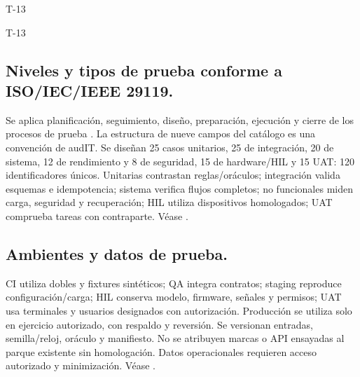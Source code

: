 \ifdefined\FormularioActual
\makeatletter
\audit@iniciarpartes
\makeatother
{\renewcommand\textoEncabezado{\color{audit-marino}Índice}\indiceDetallado}
\clearpage
\makeatletter
{}
\makeatother
{}
{}
\fi
\begin{formulario}{T-13}
\begin{contenidoExigido}{T-13}
\end{contenidoExigido}

\subsection*{Niveles y tipos de prueba conforme a ISO/IEC/IEEE 29119.}\label{sec:9-t13-1}
Se aplica planificación, seguimiento, diseño, preparación, ejecución y cierre de los procesos de prueba \parencite{iso29119_2_2021}. La estructura de nueve campos del catálogo es una convención de audIT. Se diseñan 25 casos unitarios, 25 de integración, 20 de sistema, 12 de rendimiento y 8 de seguridad, 15 de hardware/HIL y 15 UAT: 120 identificadores únicos. Unitarias contrastan reglas/oráculos; integración valida esquemas e idempotencia; sistema verifica flujos completos; no funcionales miden carga, seguridad y recuperación; HIL utiliza dispositivos homologados; UAT comprueba tareas con contraparte. Véase .

\subsection*{Ambientes y datos de prueba.}\label{sec:9-t13-2}
CI utiliza dobles y fixtures sintéticos; QA integra contratos; staging reproduce configuración/carga; HIL conserva modelo, firmware, señales y permisos; UAT usa terminales y usuarios designados con autorización. Producción se utiliza solo en ejercicio autorizado, con respaldo y reversión. Se versionan entradas, semilla/reloj, oráculo y manifiesto. No se atribuyen marcas o API ensayadas al parque existente sin homologación. Datos operacionales requieren acceso autorizado y minimización. Véase .


\end{formulario}
